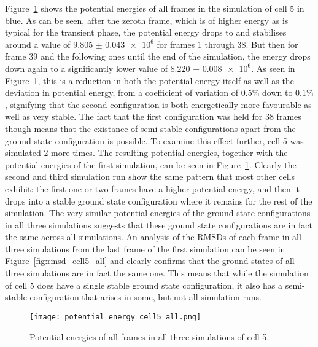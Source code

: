 Figure~\ref{fig:potential_energy_cell5_all} shows the potential energies of all frames in the simulation of cell 5 in blue. As can be seen, after the zeroth frame, which is of higher energy as is typical for the transient phase, the potential energy drops to and stabilises around a value of \(\num{9.805(43)e6}\) for frames 1 through 38. But then for frame 39 and the following ones until the end of the simulation, the energy drops down again to a significantly lower value of \(\num{8.220(8)e6}\). As seen in Figure~\ref{fig:potential_energy_cell5_all}, this is a reduction in both the potential energy itself as well as the deviation in potential energy, from a coefficient of variation of \(0.5 \%\) down to \(0.1 \%\), signifying that the second configuration is both energetically more favourable as well as very stable. The fact that the first configuration was held for 38 frames though means that the existance of semi-stable configurations apart from the ground state configuration is possible. To examine this effect further, cell 5 was simulated 2 more times. The resulting potential energies, together with the potential energies of the first simulation, can be seen in Figure~\ref{fig:potential_energy_cell5_all}. Clearly the second and third simulation run show the same pattern that most other cells exhibit: the first one or two frames have a higher potential energy, and then it drops into a stable ground state configuration where it remains for the rest of the simulation. The very similar potential energies of the ground state configurations in all three simulations suggests that these ground state configurations are in fact the same across all simulations. An analysis of the RMSDs of each frame in all three simulations from the last frame of the first simulation can be seen in Figure~\ref{fig:rmsd_cell5_all} and clearly confirms that the ground states of all three simulations are in fact the same one. This means that while the simulation of cell 5 does have a single stable ground state configuration, it also has a semi-stable configuration that arises in some, but not all simulation runs.


\begin{figure}[ht]
\centering
  \texttt{[image: potential\_energy\_cell5\_all.png]}
  \caption{Potential energies of all frames in all three simulations of cell 5.}
  \label{fig:potential_energy_cell5_all}
\end{figure}

